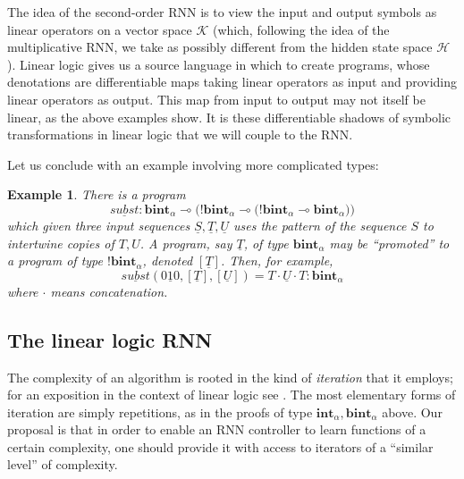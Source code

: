 \documentclass[english,letter paper,12pt,leqno]{article}
\theoremstyle{example}
\newtheorem{example}[theorem]{Example}
\numberwithin{equation}{section}
\begin{document}
The idea of the second-order RNN is to view the input and output symbols as linear operators on a vector space $\mathscr{K}$ (which, following the idea of the multiplicative RNN, we take as possibly different from the hidden state space $\mathscr{H}$). Linear logic gives us a source language in which to create programs, whose denotations are differentiable maps taking linear operators as input and providing linear operators as output. This map from input to output may not itself be linear, as the above examples show. It is these differentiable shadows of symbolic transformations in linear logic that we will couple to the RNN.
\vspace{0.2cm}

Let us conclude with an example involving more complicated types:

\begin{example} There is a program
\[
\underline{subst}: \textbf{bint}_\alpha \multimap \Big( {!}\textbf{bint}_\alpha \multimap \big( {!}\textbf{bint}_\alpha \multimap \textbf{bint}_\alpha \big)\Big)
\]
which given three input sequences $\underline{S}, \underline{T}, \underline{U}$ uses the pattern of the sequence $S$ to intertwine copies of $T,U$. A program, say $\underline{T}$, of type $\textbf{bint}_\alpha$ may be ``promoted'' to a program of type ${!} \textbf{bint}_\alpha$, denoted $[\underline{T}]$. Then, for example,
\[
\underline{subst}( \underline{010}, [\underline{T}], [\underline{U}] ) = \underline{T \cdot U \cdot T} : \textbf{bint}_\alpha
\]
where $\cdot$ means concatenation.
\end{example}

\subsection{The linear logic RNN}

The complexity of an algorithm is rooted in the kind of \emph{iteration} that it employs; for an exposition in the context of linear logic see \cite[\S]{murfet_logic}. The most elementary forms of iteration are simply repetitions, as in the proofs of type $\textbf{int}_\alpha, \textbf{bint}_\alpha$ above. Our proposal is that in order to enable an RNN controller to learn functions of a certain complexity, one should provide it with access to iterators of a ``similar level'' of complexity.

\end{document}
